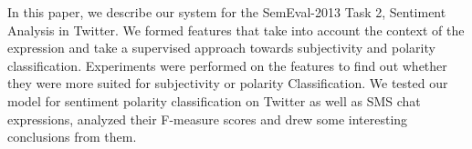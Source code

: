 In this paper, we describe our system for the SemEval-2013 Task 2, Sentiment Analysis in Twitter. We formed features that take into account the context of
 the expression and take a supervised approach towards subjectivity and polarity
 classification. Experiments were performed on the features to find out whether
 they were more suited for subjectivity or polarity Classification. We tested
 our model for sentiment polarity classification on Twitter as well as SMS chat
 expressions, analyzed their F-measure scores and drew some interesting
 conclusions from them.

